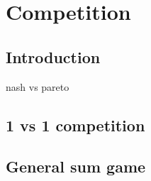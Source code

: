 \chapter{Competition}\label{ch:competition}
\section{Introduction}

nash vs pareto

\section{1 vs 1 competition}
\section{General sum game}